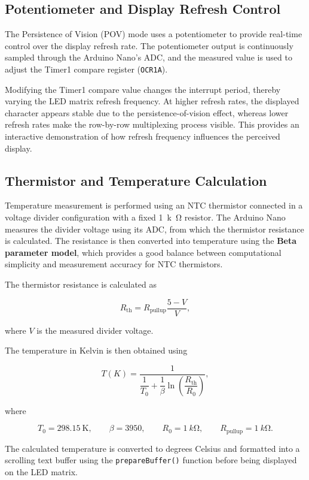 \documentclass[12pt,a4paper]{article}
\begin{document}
\subsection{Potentiometer and Display Refresh Control}

The Persistence of Vision (POV) mode uses a potentiometer to provide real-time control over the display refresh rate. The potentiometer output is continuously sampled through the Arduino Nano's ADC, and the measured value is used to adjust the Timer1 compare register (\texttt{OCR1A}).

Modifying the Timer1 compare value changes the interrupt period, thereby varying the LED matrix refresh frequency. At higher refresh rates, the displayed character appears stable due to the persistence-of-vision effect, whereas lower refresh rates make the row-by-row multiplexing process visible. This provides an interactive demonstration of how refresh frequency influences the perceived display.
\newpage

\subsection{Thermistor and Temperature Calculation}

Temperature measurement is performed using an NTC thermistor connected in a voltage divider configuration with a fixed \SI{1}{k\ohm} resistor. The Arduino Nano measures the divider voltage using its ADC, from which the thermistor resistance is calculated. The resistance is then converted into temperature using the \textbf{Beta parameter model}, which provides a good balance between computational simplicity and measurement accuracy for NTC thermistors.

The thermistor resistance is calculated as

\[
R_\mathrm{th}=R_\mathrm{pullup}\frac{5-V}{V},
\]

where \(V\) is the measured divider voltage.

The temperature in Kelvin is then obtained using

\[
T(K)=
\frac{1}
{\dfrac{1}{T_0}+
\dfrac{1}{\beta}
\ln\left(\dfrac{R_\mathrm{th}}{R_0}\right)},
\]

where

\[
T_0=298.15~\mathrm{K}, \qquad
\beta=3950, \qquad
R_0=\SI{1}{k\ohm}, \qquad
R_\mathrm{pullup}=\SI{1}{k\ohm}.
\]

The calculated temperature is converted to degrees Celsius and formatted into a scrolling text buffer using the \texttt{prepareBuffer()} function before being displayed on the LED matrix.
\newpage
\end{document}
